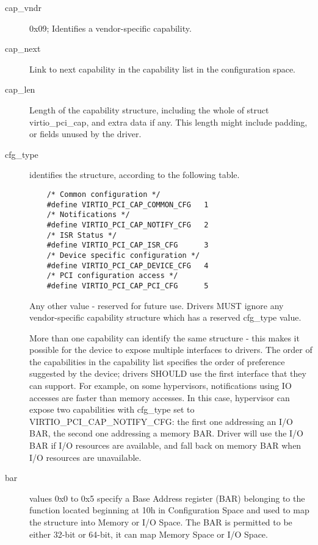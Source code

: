 \begin{description}
\item[cap_vndr]
        0x09; Identifies a vendor-specific capability.

\item[cap_next]
        Link to next capability in the capability list in the configuration space.

\item[cap_len]
        Length of the capability structure, including the whole of
        struct virtio_pci_cap, and extra data if any.
        This length might include padding, or fields unused by the driver.

\item[cfg_type]
        identifies the structure, according to the following table.

\begin{lstlisting}
	/* Common configuration */
	#define VIRTIO_PCI_CAP_COMMON_CFG	1
	/* Notifications */
	#define VIRTIO_PCI_CAP_NOTIFY_CFG	2
	/* ISR Status */
	#define VIRTIO_PCI_CAP_ISR_CFG		3
	/* Device specific configuration */
	#define VIRTIO_PCI_CAP_DEVICE_CFG	4
	/* PCI configuration access */
	#define VIRTIO_PCI_CAP_PCI_CFG		5
\end{lstlisting}

        Any other value - reserved for future use. Drivers MUST
        ignore any vendor-specific capability structure which has
        a reserved cfg_type value.

        More than one capability can identify the same structure - this makes it
        possible for the device to expose multiple interfaces to drivers.  The order of
        the capabilities in the capability list specifies the order of preference
        suggested by the device; drivers SHOULD use the first interface that they can
        support.  For example, on some hypervisors, notifications using IO accesses are
        faster than memory accesses. In this case, hypervisor can expose two
        capabilities with cfg_type set to VIRTIO_PCI_CAP_NOTIFY_CFG:
        the first one addressing an I/O BAR, the second one addressing a memory BAR.
        Driver will use the I/O BAR if I/O resources are available, and fall back on
        memory BAR when I/O resources are unavailable.

\item[bar]
        values 0x0 to 0x5 specify a Base Address register (BAR) belonging to
        the function located beginning at 10h in Configuration Space
        and used to map the structure into Memory or I/O Space.
        The BAR is permitted to be either 32-bit or 64-bit, it can map Memory Space
        or I/O Space.


\end{description}
